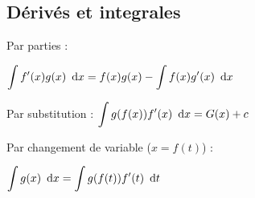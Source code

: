 \documentclass[../main.tex]{subfiles}
\begin{document}
\subsection{Dérivés et integrales}


Par parties : 

\(\displaystyle \int f'(x)g(x)\,\,\,\mathrm{d}{x} = f(x)g(x) - \int f(x)g'(x)\,\,\,\mathrm{d}{x} \)

Par substitution : 
\(\displaystyle \int g(f(x))f'(x)\,\,\,\mathrm{d}{x} = G(x) + c \)

Par changement de variable (\(x=f(t)\)) : 

\(\displaystyle \int g(x)\,\,\,\mathrm{d}{x} = \int g(f(t))f'(t) \,\,\,\mathrm{d}{t} \)
\end{document}

